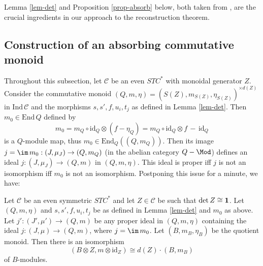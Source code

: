 \documentclass[11pt]{article}
\theoremstyle{definition}
\theoremstyle{definition}
\theoremstyle{remark}
\def\2#1{{\mathcal #1}}
\def\1#1{{\bf #1}}
\newcommand{\End}{\mathrm{End}}
\newcommand{\mcirc}{\circ}
\newcommand{\rarr}{\rightarrow}
\def\id{\mathrm{id}}
\begin{document}
\brem Lemma \ref{lem-det} and Proposition \ref{prop-absorb} below, both taken from \cite{bichon},
are the crucial ingredients in our approach to the reconstruction theorem.
\erem





\subsection{Construction of an absorbing commutative monoid} \label{ss-monoid2}
Throughout this subsection, let $\2C$ be an even $STC^*$ with monoidal generator $Z$. Consider the
commutative monoid $(Q,m,\eta)=(S(Z),m_{S(Z)},\eta_{S(Z)})^{\times d(Z)}$ in $\mathrm{Ind}\,\2C$ and
the morphisms $s,s',f,u_i,t_j$ as defined in Lemma \ref{lem-det}. Then $m_0\in\End\,Q$ defined by 
\[  m_0 = m_Q\mcirc\id_Q\otimes (f-\eta_Q)=m_Q\mcirc\id_Q\otimes f \,-\, \id_Q \]
is a $Q$-module map, thus $m_0\in\End_Q((Q,m_Q))$. Then its image 
$j=\im\,m_0:(J,\mu_J)\rarr(Q,m_Q)$ (in the abelian category $Q-\Mod$) defines 
an ideal $j:(J,\mu_J)\rarr(Q,m)$ in $(Q,m,\eta)$. This ideal is proper iff $j$ is not an
isomorphism iff $m_0$ is not an isomorphism. Postponing this issue for a minute, we have:

\bprop \label{prop-absorb} 
Let $\2C$ be an even symmetric $STC^*$ and let $Z\in\2C$ be such that $\det Z\cong\11$. Let
$(Q,m,\eta)$ and $s,s',f,u_i,t_j$ be as defined in Lemma \ref{lem-det} and $m_0$ as above. Let
$j':(J',\mu')\rarr(Q,m)$ be any proper ideal in $(Q,m,\eta)$ containing the ideal
$j:(J,\mu)\rarr(Q,m)$, where $j=\im\,m_0$. Let $(B,m_B,\eta_B)$ be the quotient monoid. Then
there is an  isomorphism 
\[ (B\otimes Z,m\otimes\id_Z)\cong d(Z)\cdot(B,m_B) \]
of $B$-modules. 
\eprop
\end{document}
